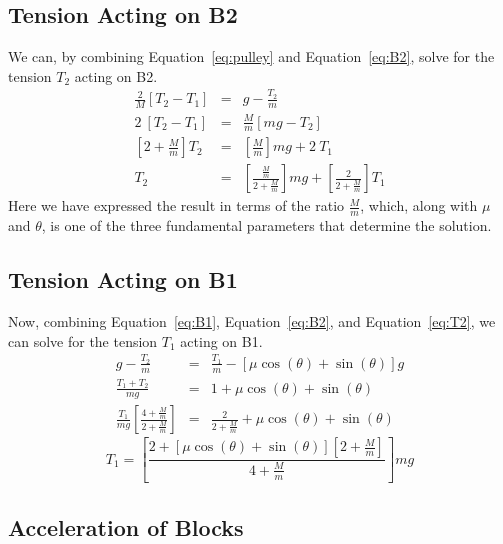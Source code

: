 \documentclass[twocolumn]{article}
\begin{document}
\subsection{Tension Acting on B2}

We can, by combining Equation~\ref{eq:pulley} and Equation~\ref{eq:B2}, solve
for the tension $T_2$ acting on B2.
\begin{eqnarray}
   \nonumber
   \tfrac{2}{M} [T_2 - T_1] &=& g - \tfrac{T_2}{m}\\
   \nonumber
   2 \: [T_2 - T_1] &=& \tfrac{M}{m} [mg - T_2]\\
   \nonumber
   \left[2 + \tfrac{M}{m}\right] T_2 &=& \left[\tfrac{M}{m}\right] mg + 2 \: T_1\\
   T_2 &=& \left[\frac{\tfrac{M}{m}}{2 + \tfrac{M}{m}}\right] mg +
           \left[\frac{2}{2 + \tfrac{M}{m}}\right] T_1
   \label{eq:T2}
\end{eqnarray}
Here we have expressed the result in terms of the ratio $\tfrac{M}{m}$, which,
along with $\mu$ and $\theta$, is one of the three fundamental parameters that
determine the solution.

\subsection{Tension Acting on B1}

Now, combining Equation~\ref{eq:B1}, Equation~\ref{eq:B2}, and
Equation~\ref{eq:T2}, we can solve for the tension $T_1$ acting on B1.
\begin{eqnarray}
   \nonumber
   g - \tfrac{T_2}{m} &=& \tfrac{T_1}{m} - [\mu \cos(\theta) + \sin(\theta)]
                          g\\
   \nonumber
   \frac{T_1 + T_2}{mg} &=& 1 + \mu \cos(\theta) + \sin(\theta)\\
   \nonumber
   \frac{T_1}{mg} \left[ \frac{4 + \tfrac{M}{m}}{2 + \tfrac{M}{m}} \right] &=&
   \frac{2}{2 + \tfrac{M}{m}} + \mu \cos(\theta) + \sin(\theta)
\end{eqnarray}
\begin{equation}
   T_1 = \left[ \frac{2 + [\mu \cos(\theta) + \sin(\theta)]\left[2 +
   \tfrac{M}{m}\right]}{4 + \tfrac{M}{m}} \right] mg
   \label{eq:T1}
\end{equation}

\subsection{Acceleration of Blocks}
\end{document}
